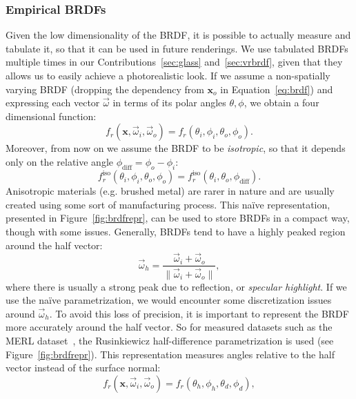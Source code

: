 \subsubsection{Empirical BRDFs}
\label{sec:empiricalbrdf}
Given the low dimensionality of the BRDF, it is possible to actually measure and tabulate it, so that it can be used in future renderings. We use tabulated BRDFs multiple times in our Contributions~\ref{sec:glass} and~\ref{sec:vrbrdf}, given that they allows us to easily achieve a photorealistic look. If we assume a non-spatially varying BRDF (dropping the dependency from $\mathbf{x}_o$ in Equation~\ref{eq:brdf}) and expressing each vector $\vec{\omega}$ in terms of its polar angles $\theta, \phi$, we obtain a four dimensional function:
\begin{equation*}
f_r(\mathbf{x}, \vec{\omega}_i,  \vec{\omega}_o) = f_r(\theta_i, \phi_i, \theta_o, \phi_o).
\end{equation*}
Moreover, from now on we assume the BRDF to be \emph{isotropic}, so that it depends only on the relative angle $\phi_\text{diff} = \phi_o - \phi_i$:
\begin{equation*}
f_r^\text{iso}(\theta_i, \phi_i, \theta_o, \phi_o) = f_r^\text{iso}(\theta_i, \theta_o, \phi_\text{diff}).
\end{equation*}
Anisotropic materials (e.g. brushed metal) are rarer in nature and are usually created using some sort of manufacturing process.
This na\"ive representation, presented in Figure~\ref{fig:brdfrepr}, can be used to store BRDFs in a compact way, though with some issues. Generally, BRDFs tend to have a highly peaked region around the half vector:
\begin{equation*}\vec{\omega}_h = \frac{\vec{\omega}_i + \vec{\omega}_o}{\|\vec{\omega}_i + \vec{\omega}_o\|},
\end{equation*}
where there is usually a strong peak due to reflection, or \emph{specular highlight}. If we use the na\"ive parametrization, we would encounter some discretization issues around $\vec{\omega}_h$. To avoid this loss of precision, it is important to represent the BRDF more accurately around the half vector. So for measured datasets such as the MERL dataset~\cite{Matusik2003}, the Rusinkiewicz half-difference parametrization is used (see Figure~\ref{fig:brdfrepr}). This representation measures angles relative to the half vector instead of the surface normal:
\begin{equation*}
f_r(\mathbf{x}, \vec{\omega}_i,  \vec{\omega}_o) = f_r(\theta_h, \phi_h, \theta_d, \phi_d),
\end{equation*}
